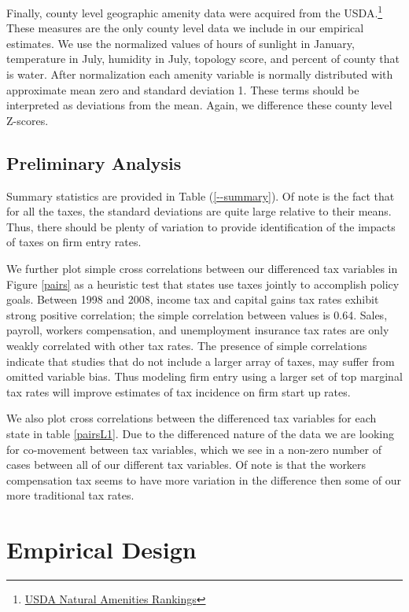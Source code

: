 \documentclass[12pt,a4paper]{article}
\begin{document}
Finally, county level geographic amenity data were acquired from the USDA.\footnote{\href{http://www.ers.usda.gov/data-products/natural-amenities-scale.aspx}{USDA Natural Amenities Rankings}} These measures are the only county level data we include in our empirical estimates. We use the normalized values of hours of sunlight in January, temperature in July, humidity in July, topology score, and percent of county that is water. After normalization each amenity variable is normally distributed with approximate mean zero and standard deviation 1. These terms should be interpreted  as deviations from the mean. Again, we difference these county level Z-scores.

\subsection{Preliminary Analysis}

Summary statistics are provided in Table (\ref{--summary}). Of note is the fact that for all the taxes, the standard deviations are quite large relative to their means. Thus, there should be plenty of variation to provide identification of the impacts of taxes on firm entry rates.

We further plot simple cross correlations between our differenced tax variables in Figure \ref{pairs} as a heuristic test that states use taxes jointly to accomplish policy goals. Between 1998 and 2008, income tax and capital gains tax rates exhibit strong positive correlation; the simple correlation between values is 0.64. Sales, payroll, workers compensation, and unemployment insurance tax rates are only weakly correlated with other tax rates. The presence of simple correlations indicate that studies that do not include a larger array of taxes, may suffer from omitted variable bias. Thus modeling firm entry using a larger set of top marginal tax rates will improve estimates of tax incidence on firm start up rates.

We also plot cross correlations between the differenced tax variables for each state in table \ref{pairsL1}. Due to the differenced nature of the data we are looking for co-movement between tax variables, which we see in a non-zero number of cases between all of our different tax variables. Of note is that the workers compensation tax seems to have more variation in the difference then some of our more traditional tax rates.

\section{Empirical Design}
\end{document}
